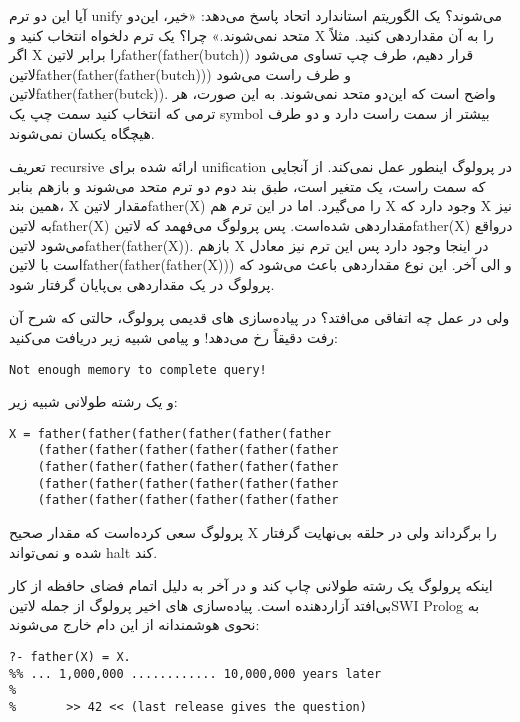 آیا این دو ترم unify می‌شوند؟ یک الگوریتم استاندارد اتحاد پاسخ می‌دهد: «خیر، این‌دو متحد نمی‌شوند.» چرا؟ یک ترم دلخواه انتخاب کنید و X را به آن مقداردهی کنید. مثلاً اگر X را برابر ‌لاتین{father(father(butch))} قرار دهیم، طرف چپ تساوی می‌شود ‌لاتین{father(father(father(butch)))} و طرف راست می‌شود ‌لاتین{father(father(butck))}. واضح است که این‌دو متحد نمی‌شوند. به این صورت، هر ترمی که انتخاب کنید سمت چپ یک symbol بیشتر از سمت راست دارد و دو طرف هیچگاه یکسان نمی‌شوند.

تعریف recursive ارائه شده برای unification در پرولوگ اینطور عمل نمی‌کند. از آنجایی که سمت راست، یک متغیر است، طبق بند دوم دو ترم متحد می‌شوند و بازهم بنابر همین بند، X مقدار ‌لاتین{father(X)} را می‌گیرد. اما در این ترم هم X وجود دارد  که X نیز به ‌لاتین{father(X)} مقداردهی شده‌است. پس پرولوگ می‌فهمد که ‌لاتین{father(X)} درواقع می‌شود ‌لاتین{father(father(X))}. بازهم X در اینجا وجود دارد پس این ترم نیز معادل است با ‌لاتین{father(father(father(X)))} و الی آخر. این نوع مقداردهی باعث می‌شود که پرولوگ در یک مقداردهی بی‌پایان گرفتار شود.

ولی در عمل چه اتفاقی می‌افتد؟ در پیاده‌سازی های قدیمی پرولوگ، حالتی که شرح آن رفت دقیقاً رخ می‌دهد! و پیامی شبیه زیر دریافت می‌کنید:

\begin{latin}
\begin{lstlisting}
Not enough memory to complete query!
\end{lstlisting}
\end{latin}

و یک رشته طولانی شبیه زیر:

\begin{latin}
\begin{lstlisting}
X = father(father(father(father(father(father 
    (father(father(father(father(father(father 
    (father(father(father(father(father(father 
    (father(father(father(father(father(father 
    (father(father(father(father(father(father

\end{lstlisting}
\end{latin}

پرولوگ سعی کرده‌است که مقدار صحیح X را برگرداند ولی در حلقه بی‌نهایت گرفتار شده و نمی‌تواند halt کند.

اینکه پرولوگ یک رشته طولانی چاپ کند و در آخر به دلیل اتمام فضای حافظه از کار بی‌افتد آزاردهنده است. پیاده‌سازی های اخیر پرولوگ از جمله ‌لاتین{SWI Prolog} به نحوی هوشمندانه از این دام خارج می‌شوند:

\begin{latin}
\begin{lstlisting}
?- father(X) = X.
%% ... 1,000,000 ............ 10,000,000 years later
% 
%       >> 42 << (last release gives the question)
\end{lstlisting}
\end{latin}

